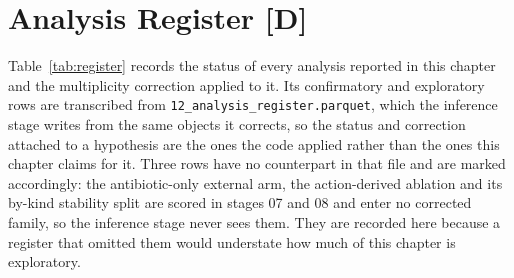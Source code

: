 

\section{Analysis Register \texorpdfstring{[D]}{[D]}}
\label{sec:register}

Table~\ref{tab:register} records the status of every analysis reported in this
chapter and the multiplicity correction applied to it. Its confirmatory and
exploratory rows are transcribed from
\texttt{12\_analysis\_\allowbreak register\allowbreak .parquet}, which the
inference stage writes from the same objects it corrects, so the status and
correction attached to a hypothesis are the ones the code applied rather than
the ones this chapter claims for it. Three rows have no counterpart in that
file and are marked accordingly: the antibiotic-only external arm, the
action-derived ablation and its by-kind stability split are scored in stages 07
and 08 and enter no corrected family, so the inference stage never sees them.
They are recorded here because a register that omitted them would understate
how much of this chapter is exploratory.

